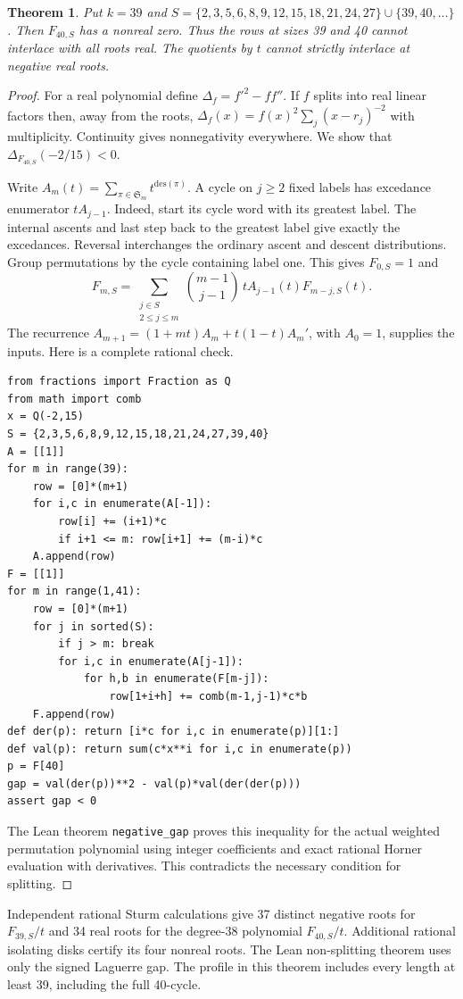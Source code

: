 \documentclass[11pt]{article}
\newtheorem{theorem}{Theorem}
\begin{document}
\begin{theorem}
Put \(k=39\) and \(S=\{2,3,5,6,8,9,12,15,18,21,24,27\}\cup\{39,40,\ldots\}\).
Then \(F_{40,S}\) has a nonreal zero. Thus the rows at sizes 39 and 40 cannot interlace with all roots real. The quotients by \(t\) cannot strictly interlace at negative real roots.
\end{theorem}
\begin{proof}
For a real polynomial define \(\Delta_f=f'^2-ff''\).
If \(f\) splits into real linear factors then, away from the roots,
\(\Delta_f(x)=f(x)^2\sum_j(x-r_j)^{-2}\) with multiplicity.
Continuity gives nonnegativity everywhere. We show that
\(\Delta_{F_{40,S}}(-2/15)<0\).

Write \(A_m(t)=\sum_{\pi\in\mathfrak S_m}t^{\mathrm{des}(\pi)}\).
A cycle on \(j\ge2\) fixed labels has excedance enumerator \(tA_{j-1}\).
Indeed, start its cycle word with its greatest label. The internal ascents and last step back to the greatest label give exactly the excedances. Reversal interchanges the ordinary ascent and descent distributions. Group permutations by the cycle containing label one. This gives \(F_{0,S}=1\) and
\[
 F_{m,S}=\sum_{\substack{j\in S\\2\le j\le m}}
 \binom{m-1}{j-1}\,t A_{j-1}(t)F_{m-j,S}(t).
\]
The recurrence \(A_{m+1}=(1+mt)A_m+t(1-t)A_m'\), with \(A_0=1\), supplies the inputs. Here is a complete rational check.
\begin{verbatim}
from fractions import Fraction as Q
from math import comb
x = Q(-2,15)
S = {2,3,5,6,8,9,12,15,18,21,24,27,39,40}
A = [[1]]
for m in range(39):
    row = [0]*(m+1)
    for i,c in enumerate(A[-1]):
        row[i] += (i+1)*c
        if i+1 <= m: row[i+1] += (m-i)*c
    A.append(row)
F = [[1]]
for m in range(1,41):
    row = [0]*(m+1)
    for j in sorted(S):
        if j > m: break
        for i,c in enumerate(A[j-1]):
            for h,b in enumerate(F[m-j]):
                row[1+i+h] += comb(m-1,j-1)*c*b
    F.append(row)
def der(p): return [i*c for i,c in enumerate(p)][1:]
def val(p): return sum(c*x**i for i,c in enumerate(p))
p = F[40]
gap = val(der(p))**2 - val(p)*val(der(der(p)))
assert gap < 0
\end{verbatim}
The Lean theorem \texttt{negative\_gap} proves this inequality for the actual weighted permutation polynomial using
integer coefficients and exact rational Horner evaluation with
derivatives. This contradicts the necessary condition for splitting.
\end{proof}

Independent rational Sturm calculations give 37 distinct negative
roots for \(F_{39,S}/t\) and 34 real roots for the degree-38
polynomial \(F_{40,S}/t\). Additional rational isolating disks
certify its four nonreal roots. The Lean non-splitting theorem uses
only the signed Laguerre gap. The profile in this theorem includes
every length at least 39, including the full 40-cycle.
\end{document}
